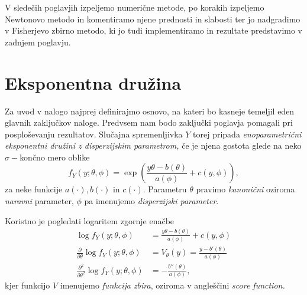 \documentclass[12pt,a4paper]{amsart}
\theoremstyle{definition} %
\theoremstyle{plain} %
\begin{document}
V sledečih poglavjih izpeljemo numerične metode, po korakih izpeljemo Newtonovo metodo in komentiramo njene prednosti in slabosti ter jo nadgradimo v Fisherjevo zbirno metodo,
ki jo tudi implementiramo in rezultate predstavimo v zadnjem poglavju.

\section{Eksponentna družina}\label{eksponentnaDruzina}
Za uvod v nalogo najprej definirajmo osnovo, na kateri bo kasneje temeljil eden glavnih zaključkov naloge. Predvsem nam bodo zaključki poglavja pomagali
pri posploševanju rezultatov. Slučajna spremenljivka $Y$ torej pripada \textit{enoparametrični eksponentni družini z disperzijskim parametrom,} če je njena gostota glede na neko 
$\sigma-$končno mero oblike 
\begin{equation}
    f_{Y}(y; \theta, \phi) = \exp{\left(\frac{y\theta - b(\theta)}{a(\phi)} + c(y, \phi)\right)},
\end{equation}
za neke funkcije $a(\cdot), b(\cdot)\text{~in~}c(\cdot).$ Parametru $\theta$ pravimo \textit{kanonični} oziroma \textit{naravni} parameter,
$\phi$ pa imenujemo \textit{disperzijski parameter}.

Koristno je pogledati logaritem zgornje enačbe
\begin{align}
    \log f_{Y}(y; \theta, \phi) &= \frac{y\theta - b(\theta)}{a(\phi)} + c(y,\phi) \\
    \frac{\partial}{\partial \theta} \log f_{Y}(y;\theta, \phi) &= V_{\theta}(y) = \frac{y - b'(\theta)}{a(\phi)} \\
    \frac{\partial^2}{\partial \theta^2}\log f_{Y}(y; \theta, \phi) &= -\frac{b''(\theta)}{a(\phi)},
\end{align}
kjer funkcijo $V$ imenujemo \textit{funkcija zbira}, oziroma v angleščini \textit{score function.}
\end{document}
